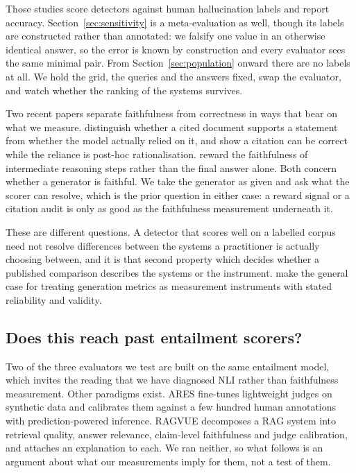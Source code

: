 \documentclass[11pt]{article}
\begin{document}
Those studies score detectors against human hallucination labels and report accuracy. Section~\ref{sec:sensitivity} is a meta-evaluation as well, though its labels are constructed rather than annotated: we falsify one value in an otherwise identical answer, so the error is known by construction and every evaluator sees the same minimal pair. From Section~\ref{sec:population} onward there are no labels at all. We hold the grid, the queries and the answers fixed, swap the evaluator, and watch whether the ranking of the systems survives.

Two recent papers separate faithfulness from correctness in ways that bear on what we measure. \citet{wallat-etal-2025} distinguish whether a cited document supports a statement from whether the model actually relied on it, and show a citation can be correct while the reliance is post-hoc rationalisation. \citet{xu-etal-2025} reward the faithfulness of intermediate reasoning steps rather than the final answer alone. Both concern whether a generator is faithful. We take the generator as given and ask what the scorer can resolve, which is the prior question in either case: a reward signal or a citation audit is only as good as the faithfulness measurement underneath it.

These are different questions. A detector that scores well on a labelled corpus need not resolve differences between the systems a practitioner is actually choosing between, and it is that second property which decides whether a published comparison describes the systems or the instrument. \citet{xiao-etal-2023} make the general case for treating generation metrics as measurement instruments with stated reliability and validity.



\subsection{Does this reach past entailment scorers?}
\label{sec:beyond-nli}

Two of the three evaluators we test are built on the same entailment model, which invites the reading that we have diagnosed NLI rather than faithfulness measurement. Other paradigms exist. ARES \citep{saad-falcon-etal-2024} fine-tunes lightweight judges on synthetic data and calibrates them against a few hundred human annotations with prediction-powered inference. RAGVUE \citep{murugaraj-etal-2026} decomposes a RAG system into retrieval quality, answer relevance, claim-level faithfulness and judge calibration, and attaches an explanation to each. We ran neither, so what follows is an argument about what our measurements imply for them, not a test of them.
\end{document}

